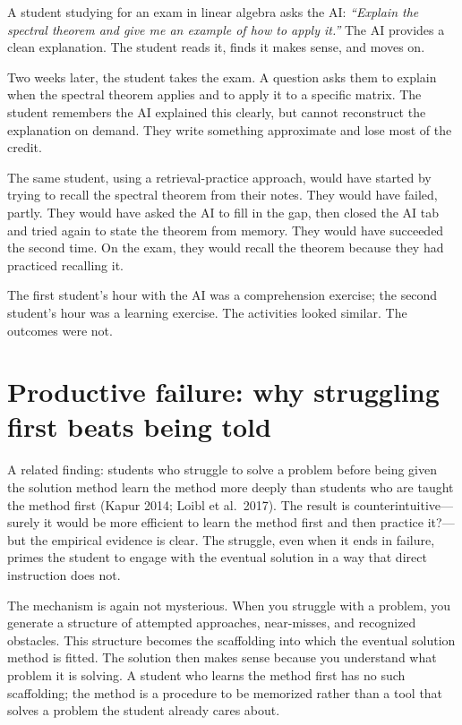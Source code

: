 \documentclass[11pt]{book}
\begin{document}
\begin{example}
A student studying for an exam in linear algebra asks the AI: \emph{``Explain the spectral theorem and give me an example of how to apply it.''} The AI provides a clean explanation. The student reads it, finds it makes sense, and moves on.

Two weeks later, the student takes the exam. A question asks them to explain when the spectral theorem applies and to apply it to a specific matrix. The student remembers the AI explained this clearly, but cannot reconstruct the explanation on demand. They write something approximate and lose most of the credit.

The same student, using a retrieval-practice approach, would have started by trying to recall the spectral theorem from their notes. They would have failed, partly. They would have asked the AI to fill in the gap, then closed the AI tab and tried again to state the theorem from memory. They would have succeeded the second time. On the exam, they would recall the theorem because they had practiced recalling it.
\end{example}

The first student's hour with the AI was a comprehension exercise; the second student's hour was a learning exercise. The activities looked similar. The outcomes were not.

\section{Productive failure: why struggling first beats being told}

A related finding: students who struggle to solve a problem before being given the solution method learn the method more deeply than students who are taught the method first (Kapur 2014; Loibl et al.\ 2017). The result is counterintuitive---surely it would be more efficient to learn the method first and then practice it?---but the empirical evidence is clear. The struggle, even when it ends in failure, primes the student to engage with the eventual solution in a way that direct instruction does not.

The mechanism is again not mysterious. When you struggle with a problem, you generate a structure of attempted approaches, near-misses, and recognized obstacles. This structure becomes the scaffolding into which the eventual solution method is fitted. The solution then makes sense because you understand what problem it is solving. A student who learns the method first has no such scaffolding; the method is a procedure to be memorized rather than a tool that solves a problem the student already cares about.
\end{document}
